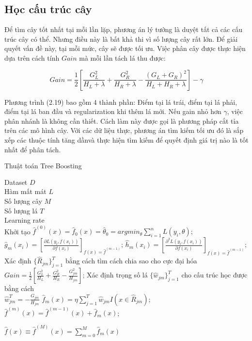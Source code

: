 \subsection{Học cấu trúc cây}

Để tìm cây tốt nhất tại mỗi lần lặp, phương án lý tưởng là duyệt tất cả các cấu trúc cây có thể. Nhưng điều này là bất khả thi vì số lượng cây rất lớn. Để giải quyết vấn đề này, tại mỗi mức, cây sẽ được tối ưu. Việc phân cây được thực hiện dựa trên cách tính $Gain$ mà mỗi lần tách lá thu được:

\begin{equation}
Gain = \frac{1}{2} \left[\frac{G_L^2}{H_L+\lambda}+\frac{G_R^2}{H_R+\lambda}-\frac{(G_L+G_R)^2}{H_L+H_R+\lambda}\right] - \gamma
\end{equation}

Phương trình (2.19) bao gồm 4 thành phần: Điểm tại lá trái, điểm tại lá phải, điểm tại lá ban đầu và regularization khi thêm lá mới. Nếu gain nhỏ hơn $\gamma$, việc phân nhánh là không cần thiết. Cách làm này được gọi là phương pháp cắt tỉa trên các mô hình cây. Với các dữ liệu thực, phương án tìm kiếm tối ưu đó là sắp xếp các thuộc tính tăng dầnvà thực hiện tìm kiếm để quyết định giá trị nào là tốt nhất để phân tách. \\

\begin{algorithm}[H]
 \caption{Thuật toán Tree Boosting}
 \label{algo_2}
 \begin{algorithmic}[1]
 \renewcommand{\algorithmicrequire}{\textbf{Input:}}
 \renewcommand{\algorithmicensure}{\textbf{Output:}}
\REQUIRE Dataset $D$\\
        Hàm mất mát $L$\\
        Số lượng cây $M$ \\
        Số lượng lá $T$ \\
        Learning rate \eta \\
        
\STATE Khởi tạo $\hat{f}^{(0)}(x) = \hat{f}_{0}(x) = \hat{\theta}_0 = argmin_\theta \sum_{i=1}^{n}L(y_i,\theta);$  
    \STATE $\hat{g}_m(x_i) = [\frac{\partial L(y_i, f(x_i))}{\partial f(x_i)}]_{f(x)=\hat{f}^{(m-1)}}$;
    \STATE $\hat{h}_m(x_i) = [\frac{\partial^2 L(y_i, f(x_i))}{\partial f(x_i)}]_{f(x)=\hat{f}^{(m-1)}}$;
    \STATE Xác định ${\{\hat{R}_{jm}}\}^T_{j=1}$  bằng cách tìm cách chia sao cho cực đại hóa\\
    $Gain = \frac{1}{2}[\frac{G^2_L}{H_L} + \frac{G^2_R}{H_R} - \frac{G^2_{jm}}{H_{jm}}]$;
    \STATE Xác định trọng số lá $\{{\hat{w}_{jm}}\}_{j=1}^T$ cho cấu trúc học được bằng cách\\
    $\hat{w}_{jm}^T = -\frac{G_{jm}}{H_{jm}}$
    \STATE $\hat{f}_m(x) = \eta \sum_{j=1}^{T}\hat{w}_{jm}I(x \in \hat{R}_{jm})$;
    \STATE $\hat{f}^{(m)}(x) = \hat{f}^{(m-1)}(x) + \hat{f}_m(x)$;
\ENDFOR

\ENSURE  $\hat{f}(x) \equiv \hat{f}^{(M)}(x) = \sum_{m=0}^{M}\hat{f}_m(x)$
\end{algorithmic} 
\end{algorithm}

